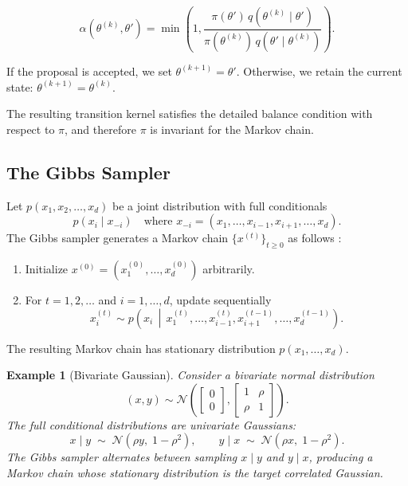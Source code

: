 \documentclass[11pt, twoside]{report}
\newtheorem{example}[theorem]{Example}
\begin{document}
\begin{equation}
\alpha(\theta^{(k)}, \theta')
=
\min\!\left(
1,
\frac{\pi(\theta')\,q(\theta^{(k)} \mid \theta')}
{\pi(\theta^{(k)})\,q(\theta' \mid \theta^{(k)})}
\right).
\label{eq:mh_accept}
\end{equation}

If the proposal is accepted, we set $\theta^{(k+1)} = \theta'$. 
Otherwise, we retain the current state: $\theta^{(k+1)} = \theta^{(k)}$.

The resulting transition kernel satisfies the detailed balance condition
with respect to $\pi$, and therefore $\pi$ is invariant for the Markov chain.

\subsection{The Gibbs Sampler}
Let $p(x_1, x_2, \dots, x_d)$ be a joint distribution with full conditionals
\[
p(x_i \mid x_{-i}) \quad \text{where } x_{-i} = (x_1, \dots, x_{i-1}, x_{i+1}, \dots, x_d).
\]
The Gibbs sampler generates a Markov chain $\{x^{(t)}\}_{t \geq 0}$ as follows \cite{geman1984stochastic}:
\begin{enumerate}
    \item Initialize $x^{(0)} = (x_1^{(0)}, \dots, x_d^{(0)})$ arbitrarily.
    \item For $t = 1,2,\dots$ and $i = 1,\dots,d$, update sequentially
    \[
    x_i^{(t)} \sim p\!\left(x_i \,\middle|\, x_1^{(t)}, \dots, x_{i-1}^{(t)}, x_{i+1}^{(t-1)}, \dots, x_d^{(t-1)}\right).
    \]
\end{enumerate}
The resulting Markov chain has stationary distribution $p(x_1, \dots, x_d)$.
\begin{example}[Bivariate Gaussian]
Consider a bivariate normal distribution
\[
(x,y) \sim \mathcal{N}\!\left(
\begin{bmatrix} 0 \\ 0 \end{bmatrix},
\begin{bmatrix} 1 & \rho \\ \rho & 1 \end{bmatrix}
\right).
\]
The full conditional distributions are univariate Gaussians:
\[
x \mid y \;\sim\; \mathcal{N}(\rho y,\; 1 - \rho^2), 
\quad\quad
y \mid x \;\sim\; \mathcal{N}(\rho x,\; 1 - \rho^2).
\]
The Gibbs sampler alternates between sampling $x \mid y$ and $y \mid x$, producing a Markov chain whose stationary distribution is the target correlated Gaussian.
\end{example}
\end{document}

